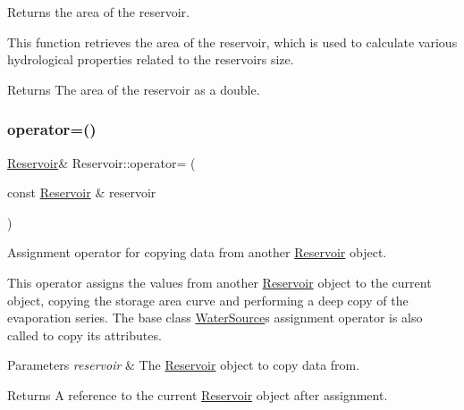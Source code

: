 Returns the area of the reservoir. 

This function retrieves the area of the reservoir, which is used to calculate various hydrological properties related to the reservoir\textquotesingle{}s size.

\begin{DoxyReturn}{Returns}
The area of the reservoir as a {\ttfamily double}. 
\end{DoxyReturn}
\mbox{\label{classReservoir_a8b43209f25276f279986d87b5a77c4f1}} 
\subsubsection{\texorpdfstring{operator=()}{operator=()}}
{\footnotesize\ttfamily \mbox{\hyperlink{classReservoir}{Reservoir}}\& Reservoir\+::operator= (\begin{DoxyParamCaption}\item[{const \mbox{\hyperlink{classReservoir}{Reservoir}} \&}]{reservoir }\end{DoxyParamCaption})}



Assignment operator for copying data from another \mbox{\hyperlink{classReservoir}{Reservoir}} object. 

This operator assigns the values from another {\ttfamily \mbox{\hyperlink{classReservoir}{Reservoir}}} object to the current object, copying the storage area curve and performing a deep copy of the evaporation series. The base class {\ttfamily \mbox{\hyperlink{classWaterSource}{Water\+Source}}}\textquotesingle{}s assignment operator is also called to copy its attributes.


\begin{DoxyParams}{Parameters}
{\em reservoir} & The {\ttfamily \mbox{\hyperlink{classReservoir}{Reservoir}}} object to copy data from.\\
\hline
\end{DoxyParams}
\begin{DoxyReturn}{Returns}
A reference to the current {\ttfamily \mbox{\hyperlink{classReservoir}{Reservoir}}} object after assignment. 
\end{DoxyReturn}
\mbox{\label{classReservoir_ac6f64dd92c401e58095e7b125855041b}} 
